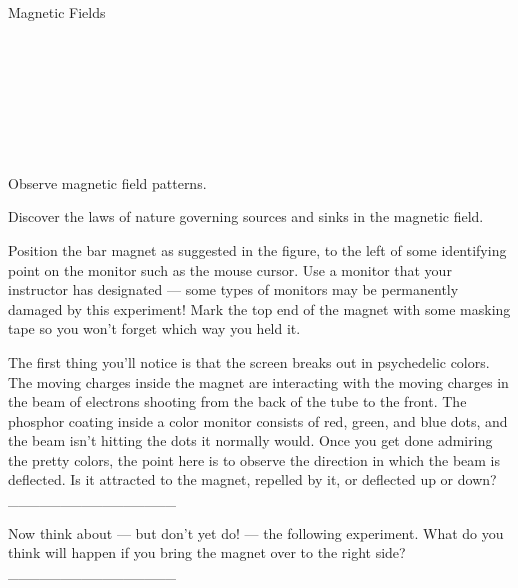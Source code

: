\begin{lab}{Magnetic Fields}
\apparatus
{}\\
\\
\\
\\
\\
\\
\\
\\

\begin{goals}

\item[] Observe magnetic field patterns.

\item[] Discover the laws of nature governing sources and sinks in the magnetic field.

\end{goals}


Position the bar magnet as suggested in the figure, to the left of some
identifying point on the monitor such as the mouse cursor. Use a monitor
that your instructor has designated --- some types of monitors may be permanently
damaged by this experiment! Mark the top end of the magnet with some masking tape
so you won't forget which way you held it.


\newcommand{\fieldslabshortanswer}{\_\_\_\_\_\_\_\_\_\_\_\_\_\_\_\_}

The first thing you'll notice is that the screen breaks out in psychedelic colors.
The moving charges inside the magnet are interacting with the moving charges in the
beam of electrons shooting from the back of the tube to the front.
The phosphor coating inside a color monitor consists of red, green, and blue dots,
and the beam isn't hitting the dots it normally would. Once you get done admiring
the pretty colors, the point here is to observe the direction in which the beam
is deflected. Is it attracted to the magnet, repelled by it, or deflected up or
down? \fieldslabshortanswer

Now think about --- but don't yet do! --- the following experiment. What do you
think will happen if you bring the magnet over to the right side? \fieldslabshortanswer


\end{lab}
